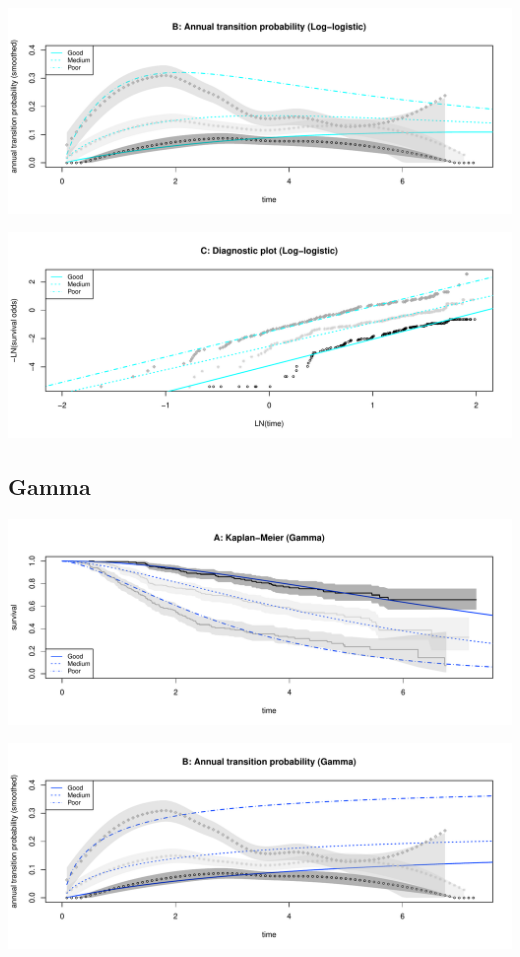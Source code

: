 \documentclass[]{article}
\begin{document}
\begin{flushleft}\includegraphics[height=0.3\textheight]{images/llog-2} \end{flushleft}

\begin{flushleft}\includegraphics[height=0.3\textheight]{images/llog-3} \end{flushleft}

\subsection{Gamma}\label{gamma}

\begin{flushleft}\includegraphics[height=0.3\textheight]{images/gam-1} \end{flushleft}

\begin{flushleft}\includegraphics[height=0.3\textheight]{images/gam-2} \end{flushleft}
\end{document}
